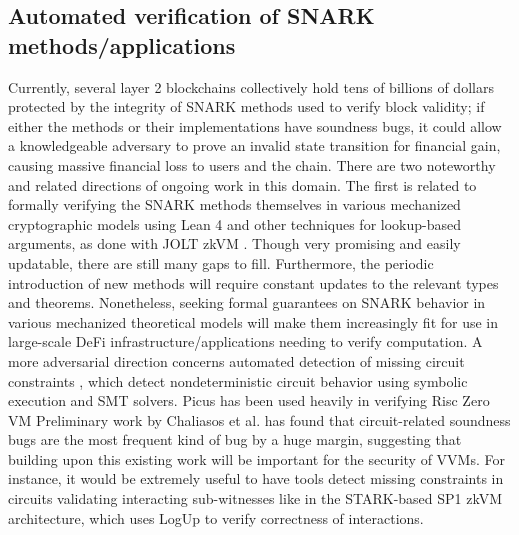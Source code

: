 \subsection{Automated verification of SNARK methods/applications}
\noindent Currently, several layer 2 blockchains collectively hold tens of billions of dollars \cite{l2beat} protected by the integrity of SNARK methods used to verify block validity; if either the methods or their implementations have soundness bugs, it could allow a knowledgeable adversary to prove an invalid state transition for financial gain, causing massive financial loss to users and the chain. There are two noteworthy and related directions of ongoing work in this domain. The first is related to formally verifying the SNARK methods themselves in various mechanized cryptographic models using Lean 4 \cite{arklib, lean4} and other techniques for lookup-based arguments, as done with JOLT zkVM \cite{jolt, joltfv}. Though very promising and easily updatable, there are still many gaps to fill. Furthermore, the periodic introduction of new methods will require constant updates to the relevant types and theorems. Nonetheless, seeking formal guarantees on SNARK behavior in various mechanized theoretical models will make them increasingly fit for use in large-scale DeFi infrastructure/applications needing to verify computation. A more adversarial direction concerns automated detection of missing circuit constraints \cite{picus}, which detect nondeterministic circuit behavior using symbolic execution and SMT solvers. Picus has been used heavily in verifying Risc Zero VM \cite{risc0} Preliminary work by Chaliasos et al. \cite{sok} has found that circuit-related soundness bugs are the most frequent kind of bug by a huge margin, suggesting that building upon this existing work will be important for the security of VVMs. For instance, it would be extremely useful to have tools detect missing constraints in circuits validating interacting sub-witnesses like in the STARK-based SP1 zkVM architecture, which uses LogUp \cite{logup} to verify correctness of interactions.

%


